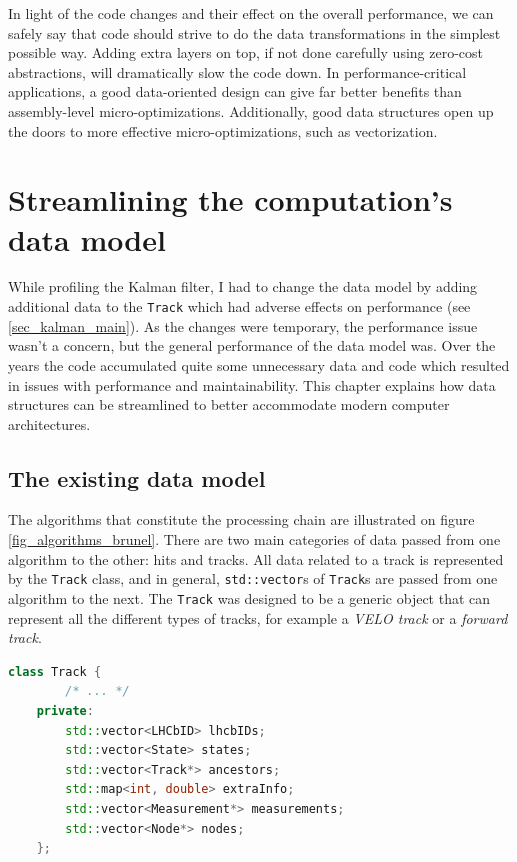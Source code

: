 \documentclass[12pt]{article}
\newcommand{\code}[1]{\texttt{#1}}
\begin{document}
In light of the code changes and their effect on the overall performance, we can safely say that code should strive to do the data transformations in the simplest possible way. Adding extra layers on top, if not done carefully using zero-cost abstractions, will dramatically slow the code down. In performance-critical applications, a good data-oriented design can give far better benefits than assembly-level micro-optimizations. Additionally, good data structures open up the doors to more effective micro-optimizations, such as vectorization.


\newpage
\section{Streamlining the computation's data model}\label{sec_datamodel_main}

While profiling the Kalman filter, I had to change the data model by adding additional data to the \code{Track} which had adverse effects on performance (see \ref{sec_kalman_main}). As the changes were temporary, the performance issue wasn't a concern, but the general performance of the data model was. Over the years the code accumulated quite some unnecessary data and code which resulted in issues with performance and maintainability. This chapter explains how data structures can be streamlined to better accommodate modern computer architectures.

\subsection{The existing data model}

The algorithms that constitute the processing chain are illustrated on figure \ref{fig_algorithms_brunel}. There are two main categories of data passed from one algorithm to the other: hits and tracks. All data related to a track is represented by the \code{Track} class, and in general, \code{std::vector}s of \code{Track}s are passed from one algorithm to the next. The \code{Track} was designed to be a generic object that can represent all the different types of tracks, for example a \textit{VELO track} or a \textit{forward track}.

\begin{lstlisting}[language=C++,caption=Simplified code of the \code{Track} class.,label=lst_datamodel_trackv2_simple
]
	class Track {
		/* ... */
	private:
		std::vector<LHCbID> lhcbIDs;
		std::vector<State> states;
		std::vector<Track*> ancestors;
		std::map<int, double> extraInfo;
		std::vector<Measurement*> measurements;
		std::vector<Node*> nodes;
	};	
\end{lstlisting}
\end{document}
